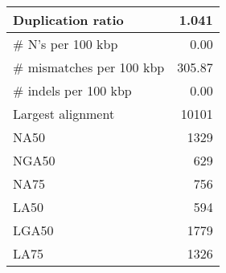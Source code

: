 \documentclass[12pt,a4paper]{article}
\begin{document}
\begin{table}[ht]
\begin{center}
\begin{tabular}{|l*{1}{|r}|}
Duplication ratio & 1.041 \\ \hline
\# N's per 100 kbp & 0.00 \\ \hline
\# mismatches per 100 kbp & 305.87 \\ \hline
\# indels per 100 kbp & 0.00 \\ \hline
Largest alignment & 10101 \\ \hline
NA50 & 1329 \\ \hline
NGA50 & 629 \\ \hline
NA75 & 756 \\ \hline
LA50 & 594 \\ \hline
LGA50 & 1779 \\ \hline
LA75 & 1326 \\ \hline
\end{tabular}
\end{center}
\end{table}
\end{document}
